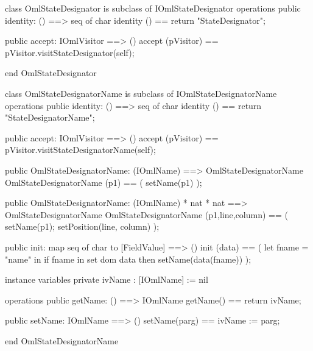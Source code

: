 \begin{vdm_al}
class OmlStateDesignator is subclass of IOmlStateDesignator
operations
  public identity: () ==> seq of char
  identity () == return "StateDesignator";

  public accept: IOmlVisitor ==> ()
  accept (pVisitor) == pVisitor.visitStateDesignator(self);

end OmlStateDesignator
\end{vdm_al}
\begin{vdm_al}
class OmlStateDesignatorName is subclass of IOmlStateDesignatorName
operations
  public identity: () ==> seq of char
  identity () == return "StateDesignatorName";

  public accept: IOmlVisitor ==> ()
  accept (pVisitor) == pVisitor.visitStateDesignatorName(self);

  public OmlStateDesignatorName:
    (IOmlName) ==> OmlStateDesignatorName
  OmlStateDesignatorName (p1) == 
    ( setName(p1) );

  public OmlStateDesignatorName:
    (IOmlName) *
    nat *
    nat ==> OmlStateDesignatorName
  OmlStateDesignatorName (p1,line,column) == 
    ( setName(p1);
      setPosition(line, column) );

  public init: map seq of char to [FieldValue] ==> ()
  init (data) ==
    ( let fname = "name" in
        if fname in set dom data
        then setName(data(fname)) );

instance variables
  private ivName : [IOmlName] := nil

operations
  public getName: () ==> IOmlName
  getName() == return ivName;

  public setName: IOmlName ==> ()
  setName(parg) == ivName := parg;

end OmlStateDesignatorName
\end{vdm_al}

